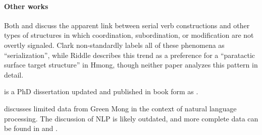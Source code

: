\documentclass[11pt,DIV=12]{scrartcl}
\newenvironment{commoncore}%
	{\hspace*{2.5em}\begin{minipage}{\dimexpr\linewidth-2.5em}%
		\KOMAoptions{parskip=half}%
		}
	{\end{minipage}}
\newenvironment{otherworks}%
	{\paragraph{Other works}%
		\hphantom{:}%
		\par\begin{commoncore}}%
	{\par\end{commoncore}}%
\newcommand{\rlink}[1]{\hyperref[#1]{\citealt{#1}}}%
\begin{document}
\begin{otherworks}
Both \citet{Riddle1990a} and \citet{Clark1992b} discuss the apparent link between serial verb constructions and other types of structures in which coordination, subordination, or modification are not overtly signaled. Clark non-standardly labels all of these phenomena as ``serialization'', while Riddle describes this trend as a preference for a ``paratactic surface target structure'' in Hmong, though neither paper analyzes this pattern in detail. 

	
\citealt{Jarkey1991} is a PhD dissertation updated and published in book form as \rlink{Jarkey2015}.
	
\citet{Harriehausen-Muhlbauer1992} discusses limited data from Green Mong in the context of natural language processing. The discussion of NLP is likely outdated, and more complete data can be found in \rlink{Jarkey2010} and \rlink{Jarkey2015}.

\end{otherworks}

\end{document}
